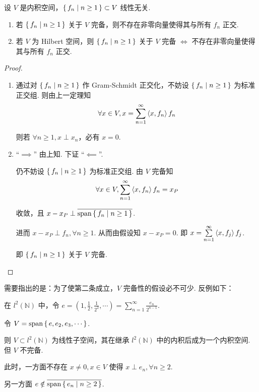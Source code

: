 \begin{property}
    设 $V$ 是内积空间，$\set{f_n|n\ge 1}\subset V$ 线性无关.

    \begin{enumerate}
        \item 若 $\set{f_n|n\ge 1}$ 关于 $V$ 完备，则不存在非零向量使得其与所有 $f_n$ 正交.
        
        \item 若 $V$ 为 Hilbert 空间，则 $\set{f_n|n\ge 1}$ 关于 $V$ 完备 $\iff$ 不存在非零向量使得其与所有 $f_n$ 正交.
    \end{enumerate}
\end{property}
\begin{proof}
    \begin{enumerate}
        \item 通过对 $\set{f_n|n\ge 1}$ 作 Gram-Schmidt 正交化，不妨设 $\set{f_n|n\ge 1}$ 为标准正交组. 则由上一定理知
$$
\forall x\in V,x=\sum_{n=1}^\infty\left\langle{x,f_n}\right\rangle f_n
$$

        则若 $\forall n\ge 1,x\perp x_n$，必有 $x=0$.

        \item “$\implies$” 由上知. 下证 “$\impliedby$”.
        
        仍不妨设 $\set{f_n|n\ge 1}$ 为标准正交组. 由 $V$ 完备知
$$
\forall x\in V,\sum_{n=1}^\infty\left\langle{x,f_n}\right\rangle f_n=x_P
$$

        收敛，且 $x-x_P\perp\overline{\mathrm{span}\set{f_n|n\ge 1}}$.

        进而 $x-x_P\perp f_n,\forall n\ge 1$. 从而由假设知 $x-x_P=0$. 即 $x=\sum\limits_{n=1}^\infty\left\langle{x,f_j}\right\rangle f_j$.

        即 $\set{f_n|n\ge 1}$ 关于 $V$ 完备.
    \end{enumerate}
\end{proof}

\begin{hint}
    需要指出的是：为了使第二条成立，$V$ 完备性的假设必不可少. 反例如下：
\end{hint}

\begin{example}
    在 $l^2(\mathbb{N})$ 中，令 $e=\displaystyle\left(1,\frac{1}{2},\frac{1}{2^2},\cdots\right)=\sum_{n=1}^\infty\frac{e_n}{2^{n-1}}$.

    令 $V=\mathrm{span}\set{e,e_2,e_3,\cdots}$.

    则 $V\subset l^2(\mathbb{N})$ 为线性子空间，其在继承 $l^2(\mathbb{N})$ 中的内积后成为一个内积空间. 但 $V$ 不完备.

    此时，一方面不存在 $x\ne 0,x\in V$ 使得 $x\perp e_n,\forall n\ge 2$.

    另一方面 $e\notin\overline{\mathrm{span}\set{e_n|n\ge 2}}$.
\end{example}

